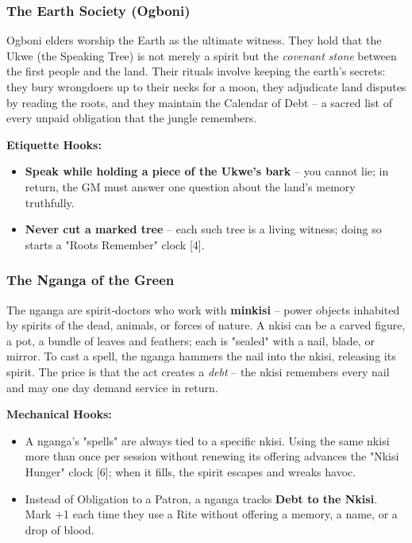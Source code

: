 \documentclass[11pt]{book}
\begin{document}
\subsubsection*{The Earth Society (Ogboni)}
Ogboni elders worship the Earth as the ultimate witness. They hold that the Ukwe (the Speaking Tree) is not merely a spirit but the \textit{covenant stone} between the first people and the land. Their rituals involve keeping the earth's secrets: they bury wrongdoers up to their necks for a moon, they adjudicate land disputes by reading the roots, and they maintain the Calendar of Debt -- a sacred list of every unpaid obligation that the jungle remembers.

\textbf{Etiquette Hooks:}
\begin{itemize}
\item \textbf{Speak while holding a piece of the Ukwe's bark} -- you cannot lie; in return, the GM must answer one question about the land's memory truthfully.
\item \textbf{Never cut a marked tree} -- each such tree is a living witness; doing so starts a "Roots Remember" clock [4].
\end{itemize}

\subsubsection*{The Nganga of the Green}
The nganga are spirit‑doctors who work with \textbf{minkisi} -- power objects inhabited by spirits of the dead, animals, or forces of nature. A nkisi can be a carved figure, a pot, a bundle of leaves and feathers; each is "sealed" with a nail, blade, or mirror. To cast a spell, the nganga hammers the nail into the nkisi, releasing its spirit. The price is that the act creates a \textit{debt} -- the nkisi remembers every nail and may one day demand service in return.

\textbf{Mechanical Hooks:}
\begin{itemize}
\item A nganga's "spells" are always tied to a specific nkisi. Using the same nkisi more than once per session without renewing its offering advances the "Nkisi Hunger" clock [6]; when it fills, the spirit escapes and wreaks havoc.
\item Instead of Obligation to a Patron, a nganga tracks \textbf{Debt to the Nkisi}. Mark +1 each time they use a Rite without offering a memory, a name, or a drop of blood.
\end{itemize}
\end{document}
